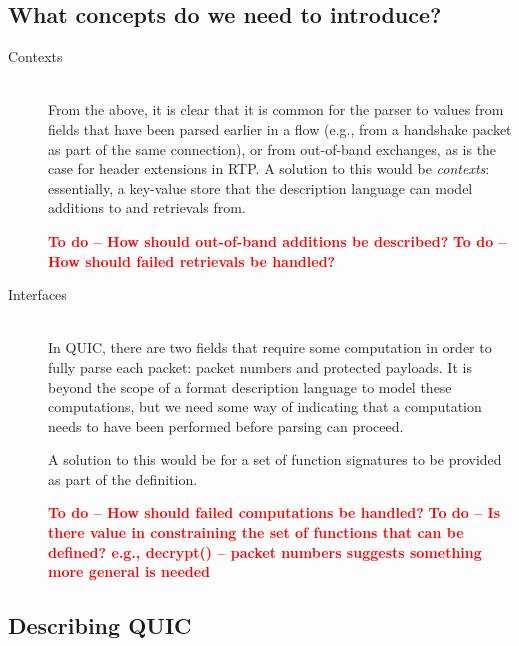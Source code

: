 \documentclass[10pt,a4paper]{article}
\newcommand{\todo}[1]{\textbf{\textcolor{red}{To do -- #1}}}
\begin{document}
\subsection{What concepts do we need to introduce?}

\begin{description}
	\item[Contexts] \hfill \\
	From the above, it is clear that it is common for the parser to values from fields that
	have been parsed earlier in a flow (e.g., from a handshake packet as part of the same
	connection), or from out-of-band exchanges, as is the case for header extensions in
	RTP. A solution to this would be \emph{contexts}: essentially, a key-value store that
	the description language can model additions to and retrievals from.
	
	\todo{How should out-of-band additions be described?}
	\todo{How should failed retrievals be handled?}
	
	\item[Interfaces] \hfill \\
	In QUIC, there are two fields that require some computation in order to fully parse
	each packet: packet numbers and protected payloads. It is beyond the scope of a
	format description language to model these computations, but we need some way of
	indicating that a computation needs to have been performed before parsing can proceed.
	
	A solution to this would be for a set of function signatures to be provided as part
	of the definition.
	
	\todo{How should failed computations be handled?}
	\todo{Is there value in constraining the set of functions that can be defined? e.g.,
	      decrypt() -- packet numbers suggests something more general is needed}
\end{description}

\subsection{Describing QUIC}
\end{document}
